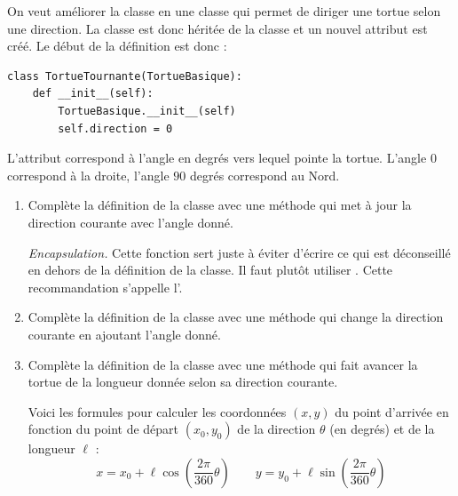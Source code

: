 \documentclass[11pt,class=report,crop=false]{standalone}
\begin{document}
\begin{activite}



On veut améliorer la classe  en une classe  qui permet de diriger une tortue selon une direction.
La classe  est donc héritée de la classe  et un nouvel attribut  est créé.
Le début de la définition est donc :

\begin{lstlisting}
class TortueTournante(TortueBasique):
    def __init__(self):   
        TortueBasique.__init__(self)
        self.direction = 0
\end{lstlisting}        
       
L'attribut  correspond à l'angle en degrés vers lequel pointe la tortue. L'angle $0$ correspond à la droite, l'angle $90$ degrés correspond au Nord. %

\begin{enumerate}
  \item Complète la définition de la classe avec une méthode  qui met à jour la direction courante avec l'angle donné. 
  
  \emph{Encapsulation.} Cette fonction sert juste à éviter d'écrire  ce qui est déconseillé en dehors de la définition de la classe. Il faut plutôt utiliser . Cette recommandation s'appelle l'.
  
  \item Complète la définition de la classe avec une méthode  qui change la direction courante en ajoutant l'angle donné. 
  
  \item Complète la définition de la classe avec une méthode 
  qui fait avancer la tortue de la longueur donnée selon sa direction courante.
  
  Voici les formules pour calculer les coordonnées $(x,y)$ du point d'arrivée en fonction du point de départ $(x_0,y_0)$ de la direction $\theta$ (en degrés) et de la longueur $\ell$ :
  $$x = x_0 + \ell \cos \left(\frac{2\pi}{360}\theta\right)  \qquad y = y_0 + \ell \sin\left(\frac{2\pi}{360}\theta\right) $$
 

\end{enumerate}
\end{activite}
\end{document}
